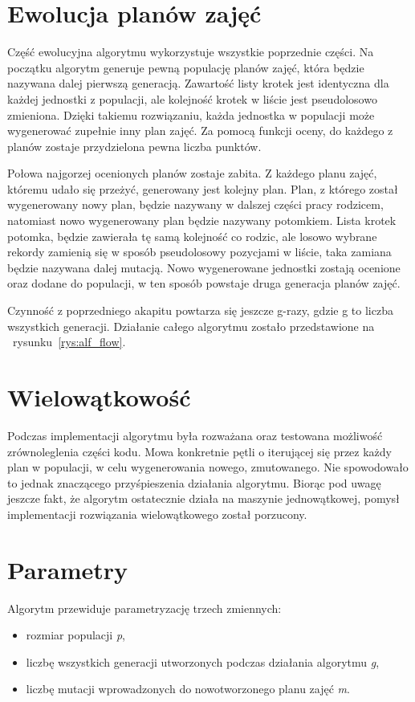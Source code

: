 \section{Ewolucja planów zajęć}

    Część ewolucyjna algorytmu wykorzystuje wszystkie poprzednie części. Na początku algorytm generuje pewną populację planów zajęć, która będzie nazywana dalej pierwszą generacją. Zawartość listy krotek jest identyczna dla każdej jednostki z populacji, ale kolejność krotek w liście jest pseudolosowo zmieniona. Dzięki takiemu rozwiązaniu, każda jednostka w populacji może wygenerować zupełnie inny plan zajęć. Za pomocą funkcji oceny, do każdego z planów zostaje przydzielona pewna liczba punktów. 

Połowa najgorzej ocenionych planów zostaje zabita. Z każdego planu zajęć, któremu udało się przeżyć, generowany jest kolejny plan. Plan, z którego został wygenerowany nowy plan, będzie nazywany w dalszej części pracy rodzicem, natomiast nowo wygenerowany plan będzie nazywany potomkiem. Lista krotek potomka, będzie zawierała tę samą kolejność co rodzic, ale losowo wybrane rekordy zamienią się w sposób pseudolosowy pozycjami w liście, taka zamiana będzie nazywana dalej mutacją. Nowo wygenerowane jednostki zostają ocenione oraz dodane do populacji, w ten sposób powstaje druga generacja planów zajęć.

    Czynność z poprzedniego akapitu powtarza się jeszcze g-razy, gdzie g to liczba wszystkich generacji. Działanie całego algorytmu zostało przedstawione na ~rysunku~\ref{rys:alf_flow}.


\section{Wielowątkowość}

Podczas implementacji algorytmu była rozważana oraz testowana możliwość zrównoleglenia części kodu. Mowa konkretnie pętli o iterującej się przez każdy plan w populacji, w celu wygenerowania nowego, zmutowanego. Nie spowodowało to jednak znaczącego przyśpieszenia działania algorytmu. Biorąc pod uwagę jeszcze fakt, że algorytm ostatecznie działa na maszynie jednowątkowej, pomysł implementacji rozwiązania wielowątkowego został porzucony.


\section{Parametry}
Algorytm przewiduje parametryzację trzech zmiennych:
\begin{itemize}
	\item rozmiar populacji \textit{p},
	\item liczbę wszystkich generacji utworzonych podczas działania algorytmu \textit{g},
	\item liczbę mutacji wprowadzonych do nowotworzonego planu zajęć \textit{m}.
\end{itemize}

